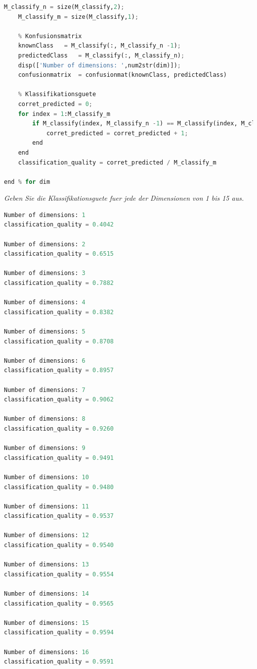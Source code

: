 \documentclass[12pt]{article}
\begin{document}
\begin{lstlisting}[language=Python]
    M_classify_n = size(M_classify,2);
    M_classify_m = size(M_classify,1);

    % Konfusionsmatrix
    knownClass	 = M_classify(:, M_classify_n -1);
    predictedClass	 = M_classify(:, M_classify_n);
    disp(['Number of dimensions: ',num2str(dim)]);
    confusionmatrix	 = confusionmat(knownClass, predictedClass)

    % Klassifikationsguete
    corret_predicted = 0;
    for index = 1:M_classify_m
        if M_classify(index, M_classify_n -1) == M_classify(index, M_classify_n)
            corret_predicted = corret_predicted + 1;
        end
    end
    classification_quality = corret_predicted / M_classify_m
    
end % for dim
\end{lstlisting}
\newpage
\textit{Geben Sie die Klassifikationsguete fuer jede der Dimensionen von 1 bis 15 aus.}\\
\begin{lstlisting}[language=Python]
Number of dimensions: 1
classification_quality = 0.4042

Number of dimensions: 2
classification_quality = 0.6515

Number of dimensions: 3
classification_quality = 0.7882

Number of dimensions: 4
classification_quality = 0.8382

Number of dimensions: 5
classification_quality = 0.8708

Number of dimensions: 6
classification_quality = 0.8957

Number of dimensions: 7
classification_quality = 0.9062

Number of dimensions: 8
classification_quality = 0.9260

Number of dimensions: 9
classification_quality = 0.9491

Number of dimensions: 10
classification_quality = 0.9480

Number of dimensions: 11
classification_quality = 0.9537

Number of dimensions: 12
classification_quality = 0.9540

Number of dimensions: 13
classification_quality = 0.9554

Number of dimensions: 14
classification_quality = 0.9565

Number of dimensions: 15
classification_quality = 0.9594

Number of dimensions: 16
classification_quality = 0.9591
\end{lstlisting}
\newpage
\end{document}
